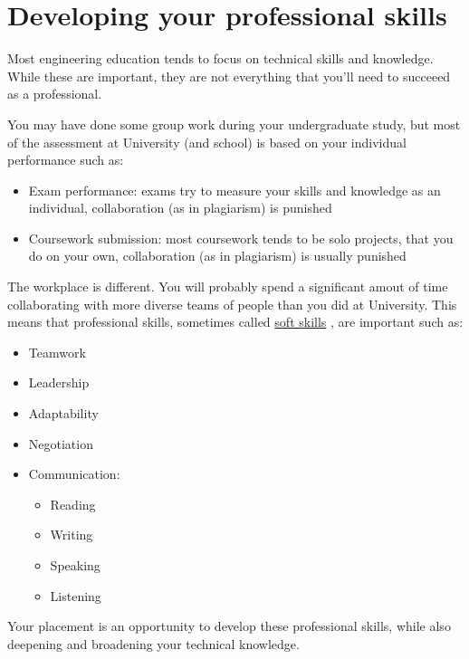 \documentclass[
]{book}
\providecommand{\tightlist}{%
  \setlength{\itemsep}{0pt}\setlength{\parskip}{0pt}}
\begin{document}
\section{Developing your professional skills}\label{soft}

Most engineering education tends to focus on technical skills and knowledge. While these are important, they are not everything that you'll need to succeeed as a professional.

You may have done some group work during your undergraduate study, but most of the assessment at University (and school) is based on your individual performance such as:

\begin{itemize}
\tightlist
\item
  Exam performance: exams try to measure your skills and knowledge as an individual, collaboration (as in plagiarism) is punished
\item
  Coursework submission: most coursework tends to be solo projects, that you do on your own, collaboration (as in plagiarism) is usually punished
\end{itemize}

The workplace is different. You will probably spend a significant amout of time collaborating with more diverse teams of people than you did at University. This means that professional skills, sometimes called \href{https://en.wikipedia.org/wiki/Soft_skills}{soft skills} , are important such as:

\begin{itemize}
\tightlist
\item
  Teamwork \citep{soft}
\item
  Leadership \citep{transferable}
\item
  Adaptability \citep{professionalism}
\item
  Negotiation \citep{verbalising}
\item
  Communication:

  \begin{itemize}
  \tightlist
  \item
    Reading \citep{reading}
  \item
    Writing \citep{writing}
  \item
    Speaking \citep{speaking}
  \item
    Listening \citep{hearing}
  \end{itemize}
\end{itemize}

Your placement is an opportunity to develop these professional skills, while also deepening and broadening your technical knowledge.
\end{document}
